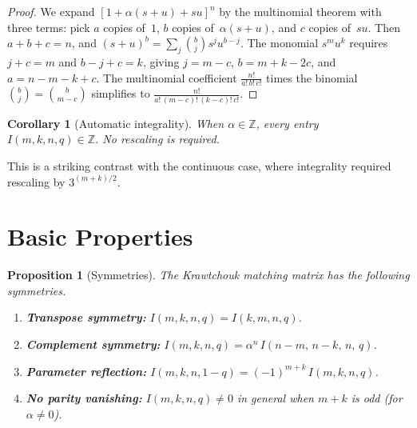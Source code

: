 \documentclass[11pt,a4paper]{article}
\theoremstyle{plain}
\newtheorem{proposition}[theorem]{Proposition}
\newtheorem{corollary}[theorem]{Corollary}
\theoremstyle{definition}
\begin{document}
\begin{proof}
We expand $[1 + \alpha(s+u) + su]^n$ by the multinomial theorem with
three terms: pick $a$ copies of~$1$, $b$ copies of~$\alpha(s+u)$,
and $c$ copies of~$su$. Then $a + b + c = n$, and $(s+u)^b =
\sum_j \binom{b}{j} s^j u^{b-j}$. The monomial $s^m u^k$ requires
$j + c = m$ and $b - j + c = k$, giving $j = m - c$,
$b = m + k - 2c$, and $a = n - m - k + c$. The multinomial
coefficient $\frac{n!}{a!\,b!\,c!}$ times the binomial
$\binom{b}{j} = \binom{b}{m-c}$ simplifies to
$\frac{n!}{a!\,(m-c)!\,(k-c)!\,c!}$.
\end{proof}

\begin{tcolorbox}[colback=black!5, colframe=black!5, boxrule=0pt,
  sharp corners]
\begin{corollary}[Automatic integrality]\label{cor:int}
When $\alpha \in \mathbb{Z}$, every entry
$I(m, k, n, q) \in \mathbb{Z}$.
No rescaling is required.
\end{corollary}
\end{tcolorbox}

This is a striking contrast with the continuous case, where
integrality required rescaling by $3^{(m+k)/2}$.

\section{Basic Properties}

\begin{tcolorbox}[colback=black!5, colframe=black!5, boxrule=0pt,
  sharp corners]
\begin{proposition}[Symmetries]\label{prop:sym}
The Krawtchouk matching matrix has the following symmetries.
\begin{enumerate}
\item \textbf{Transpose symmetry:}
  $I(m, k, n, q) = I(k, m, n, q)$.
\item \textbf{Complement symmetry:}
  $I(m, k, n, q) = \alpha^n\, I(n{-}m,\, n{-}k,\, n,\, q)$.
\item \textbf{Parameter reflection:}
  $I(m, k, n, 1{-}q) = (-1)^{m+k}\, I(m, k, n, q)$.
\item \textbf{No parity vanishing:}
  $I(m, k, n, q) \ne 0$ in general when $m + k$ is odd
  (for $\alpha \ne 0$).
\end{enumerate}
\end{proposition}
\end{tcolorbox}
\end{document}
